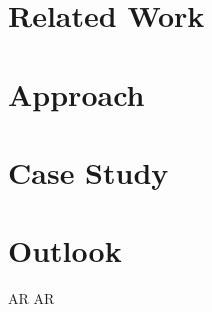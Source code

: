 \documentclass[11pt, a4paper]{article}
\begin{document}
	\section*{Related Work}
		\lipsum[3]

	\section*{Approach}
		\lipsum[4]

	\section*{Case Study}
		\lipsum[5]

	\section*{Outlook}
		\lipsum[6] \cite{Dey2016} \cite{Nilsson2007} \cite{Poupyrev2002} \ac{AR} \ac{AR}

	\pagebreak
	\printbibliography
\restoregeometry
\end{document}
